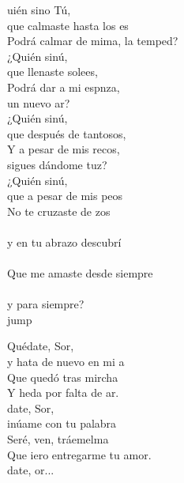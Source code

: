 \begin{cancion}%
	uién sino Tú,\\
	que calmaste hasta los es\\
	Podrá calmar de mima, la temped?\\
	¿Quién sinú, \\
	que llenaste solees,\\
	Podrá dar a mi espnza, \\
	un nuevo ar?\\
	¿Quién sinú, \\
	que después de tantosos, \\
	Y a pesar de mis recos,\\
	sigues dándome tuz?\\
	¿Quién sinú, \\
	que a pesar de mis peos\\
	No te cruzaste de zos\\
	\jump\\
y en tu abrazo descubrí\\
	\jump\\
Que me amaste desde siempre \\
	\jump\\
y para siempre?\\jump\\
	\begin{chorus}%
	Quédate, Sor,\\
	y hata de nuevo en mi a\\
	Que  quedó tras mircha\\
	Y heda por falta de ar.\\
	date, Sor, \\
	inúame con tu palabra\\
	Seré, ven, tráemelma \\
	Que iero entregarme tu amor.\\
	date, or...          \\
	\end{chorus}%

\end{cancion}
